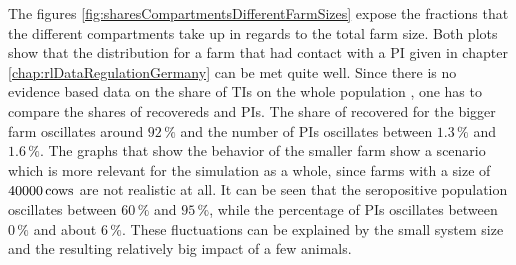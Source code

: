 The figures \ref{fig:sharesCompartmentsDifferentFarmSizes} expose the fractions that the different compartments take up in regards to the total farm size. Both plots show that the distribution for a farm that had contact with a PI given in chapter \ref{chap:rlDataRegulationGermany}  can be met quite well. Since there is no evidence based data on the share of TIs on the whole population \citep{personalCom}, one has to compare the shares of recovereds and PIs. The share of recovered for the bigger farm oscillates around $92\,\%$ and the number of PIs oscillates between $1.3\,\%$ and $1.6\,\%$. The graphs that show the behavior of the smaller farm show a scenario which is more relevant for the simulation as a whole, since farms with a size of $40000\,\text{cows}$ are not realistic at all. It can be seen that the seropositive population oscillates between $60\,\%$ and $95\,\%$, while the percentage of PIs oscillates between $0\,\%$ and about $6\,\%$. These fluctuations can be explained by the small system size and the resulting relatively big impact of a few animals. 

